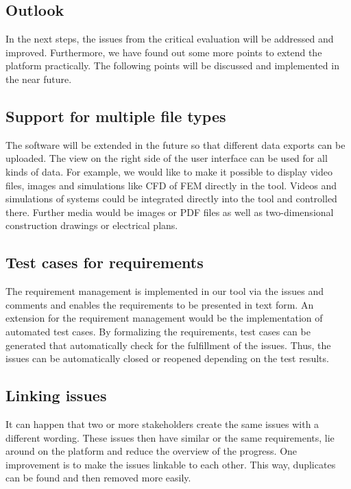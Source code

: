 \subsection*{Outlook}
In the next steps, the issues from the critical evaluation will be addressed and improved. Furthermore, we have found out some more points to extend the platform practically. The following points will be discussed and implemented in the near future.

\subsection*{Support for multiple file types}
The software will be extended in the future so that different data exports can be uploaded. The view on the right side of the user interface can be used for all kinds of data. For example, we would like to make it possible to display video files, images and simulations like CFD of FEM directly in the tool. Videos and simulations of systems could be integrated directly into the tool and controlled there. Further media would be images or PDF files as well as two-dimensional construction drawings or electrical plans.

\subsection*{Test cases for requirements}
The requirement management is implemented in our tool via the issues and comments and enables the requirements to be presented in text form. An extension for the requirement management would be the implementation of automated test cases. By formalizing the requirements, test cases can be generated that automatically check for the fulfillment of the issues. Thus, the issues can be automatically closed or reopened depending on the test results.

\subsection*{Linking issues}
It can happen that two or more stakeholders create the same issues with a different wording. These issues then have similar or the same requirements, lie around on the platform and reduce the overview of the progress. One improvement is to make the issues linkable to each other. This way, duplicates can be found and then removed more easily.

